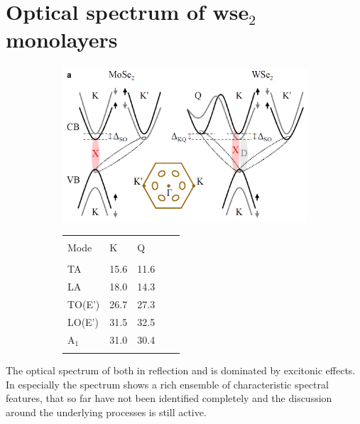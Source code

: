 \section{Optical spectrum of ws\textup{e}$_2$ monolayers}\label{composition}

\begin{figure}[t]
\centering
\begin{subfigure}{0.69\textwidth}
	\includegraphics[width=.8\textwidth]{Band_structure_momentum_dark}
\end{subfigure}
\begin{subfigure}{0.3\textwidth}
	\begin{tabular}{lllll}
	\hline
	\hline\\
	Mode&K&Q\\
	\hline\\
	TA&15.6&11.6\\
	LA&18.0&14.3\\
	TO(E')&26.7&27.3\\
	LO(E')&31.5&32.5\\
	A$_1$&31.0&30.4\\
	\\\hline
	\end{tabular}
\end{subfigure}
\caption{\cite{jin_intrinsic_2014}}\label{phonon_band}
\end{figure}

The optical spectrum of \tmds both in reflection and \pl is dominated by excitonic effects. In \wse especially the \pl spectrum shows a rich ensemble of characteristic spectral features, that so far have not been identified completely and the discussion around the underlying processes is still active.

